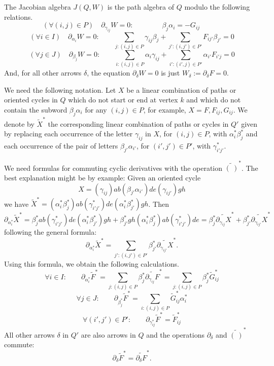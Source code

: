 \documentclass[ALCO,ThmDefs,Unicode,epreuves]{cedram}
\begin{document}
The Jacobian algebra $J(Q,W)$ is the path algebra of $Q$ modulo the following relations.
\[
	(\forall (i,j)\in P)\quad \partial_{\gamma_{ij}}W=0:\qquad\qquad \beta_j\alpha_i=-G_{ij}\qquad\quad 
\]
\begin{equation}\label{partial alpha-i W=0}
	(\forall i\in I)\quad \partial_{\alpha_i}W=0:\qquad \sum_{j:(i,j)\in P} \gamma_{ij}\beta_j+\sum_{j':(i,j')\in P'} F_{ij'}\beta_{j'} =0
\end{equation}
\[
	(\forall j\in J)\quad \partial_{\beta_j}W=0:\qquad \sum_{i: (i,j)\in P} \alpha_i\gamma_{ij}+\sum_{i': (i',j)\in P'} \alpha_{i'}F_{i'j} =0
\]
And, for all other arrows $\delta$, the equation $\partial_\delta W=0$ is just $W_\delta:=\partial_\delta F=0$.

We need the following notation. Let $X$ be a linear combination of paths or oriented cycles in $Q$ which do not start or end at vertex $k$ and which do not contain the subword $\beta_j\alpha_i$ for any $(i,j)\in P$, for example, $X=F,F_{ij},G_{ij}$. We denote by $\widetilde X^\ast$ the corresponding linear combination of paths or cycles in $Q'$ given by replacing each occurrence of the letter $\gamma_{ij}$ in $X$, for $(i,j)\in P$, with $\alpha_i^\ast\beta_j^\ast$ and each occurrence of the pair of letters $\beta_{j'}\alpha_{i'}$, for $(i',j')\in P'$, with $\gamma_{i'j'}^\ast$. 

We need formulas for commuting cyclic derivatives with the operation $\widetilde{(\ )}^\ast$. The best explanation might be by example: Given an oriented cycle 
\[X=(\gamma_{ij})ab(\beta_{j'}\alpha_{i'})de(\gamma_{ij'})gh
\]
 we have $\widetilde X^\ast=
(\alpha_i^\ast\beta_j^\ast)  ab( \gamma_{i'j'}^\ast )de(\alpha_i^\ast\beta_{j'}^\ast )gh$. Then 
\[
\partial_{\alpha_i^\ast} \widetilde X^\ast=\beta_j^\ast  ab( \gamma_{i'j'}^\ast )de(\alpha_i^\ast\beta_{j'}^\ast )gh+
\beta_{j'}^\ast gh (\alpha_i^\ast\beta_j^\ast)  ab( \gamma_{i'j'}^\ast )de
= \beta_j^\ast \widetilde{\partial_{\gamma_{ij}}X}^\ast+\beta_{j'}^\ast \widetilde{\partial_{\gamma_{ij'}}X}^\ast
\]
following the general formula:
\[
	\partial_{\alpha_i^\ast} \widetilde X^\ast=\sum_{j':(i,j')\in P'}\beta_{j'}^\ast \widetilde{\partial_{\gamma_{ij'}}X}^\ast .
\]
Using this formula, we obtain the following calculations.
\begin{equation}\label{eq: derivative of tilde F}
	\forall i\in I:\qquad \partial_{\alpha_i^\ast}\widetilde F^\ast=\sum_{j:(i,j)\in P}\beta_{j}^\ast \widetilde{\partial_{\gamma_{ij}}F}^\ast
	=\sum_{j:(i,j)\in P}\beta_{j}^\ast \widetilde G_{ij}^\ast
\end{equation}
\[
	\forall j\in J:\qquad \partial_{\beta_j^\ast}\widetilde F^\ast=\sum_{i:(i,j)\in P} \widetilde G_{ij}^\ast\alpha_{i}^\ast
\]
\[
	\forall (i',j')\in P': \qquad \partial_{\gamma_{ij}^\ast}\widetilde F^\ast=\widetilde F_{ij}^\ast
\]
All other arrows $\delta$ in $Q'$ are also arrows in $Q$ and the operations $\partial_\delta$ and $\widetilde{(\ )}^\ast$ commute:
\[
	\partial_\delta \widetilde F^\ast=\widetilde{\partial_\delta F}^\ast.
\]
\end{document}
